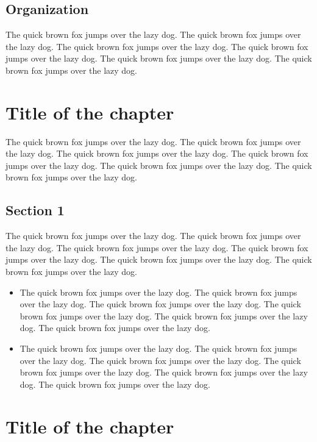\documentclass[11pt,a4paper]{report}
\begin{document}
\section{Organization}
\label{sec:org}
The quick brown fox jumps over the lazy dog. The quick brown fox jumps over the lazy dog. The quick brown fox jumps over the lazy dog. The quick brown fox jumps over the lazy dog. The quick brown fox jumps over the lazy dog. The quick brown fox jumps over the lazy dog.

\chapter{Title of the chapter}
\label{cap:name1}

The quick brown fox jumps over the lazy dog. The quick brown fox jumps over the lazy dog. The quick brown fox jumps over the lazy dog. The quick brown fox jumps over the lazy dog. The quick brown fox jumps over the lazy dog. The quick brown fox jumps over the lazy dog.

\section{Section 1}
\label{sec:sec1}

The quick brown fox jumps over the lazy dog. The quick brown fox jumps over the lazy dog. The quick brown fox jumps over the lazy dog. The quick brown fox jumps over the lazy dog. The quick brown fox jumps over the lazy dog. The quick brown fox jumps over the lazy dog.

\begin{itemize}
    \item The quick brown fox jumps over the lazy dog. The quick brown fox jumps over the lazy dog. The quick brown fox jumps over the lazy dog. The quick brown fox jumps over the lazy dog. The quick brown fox jumps over the lazy dog. The quick brown fox jumps over the lazy dog.
    \item The quick brown fox jumps over the lazy dog. The quick brown fox jumps over the lazy dog. The quick brown fox jumps over the lazy dog. The quick brown fox jumps over the lazy dog. The quick brown fox jumps over the lazy dog. The quick brown fox jumps over the lazy dog.
\end{itemize}

\chapter{Title of the chapter}
\label{cap:name2}
\end{document}
